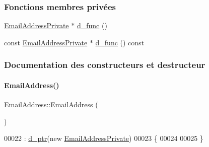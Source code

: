 \subsubsection*{Fonctions membres privées}
\begin{DoxyCompactItemize}
\item 
\hyperlink{class_simple_mail_1_1_email_address_private}{Email\+Address\+Private} $\ast$ \hyperlink{class_simple_mail_1_1_email_address_aa1ad0e3e3ff067e2c41ed350edc23a03}{d\+\_\+func} ()
\item 
const \hyperlink{class_simple_mail_1_1_email_address_private}{Email\+Address\+Private} $\ast$ \hyperlink{class_simple_mail_1_1_email_address_a70c5d2b0aabacfdfa692710f43cf0b5e}{d\+\_\+func} () const
\end{DoxyCompactItemize}


\subsubsection{Documentation des constructeurs et destructeur}
\mbox{\label{class_simple_mail_1_1_email_address_a6d295effd1195009a2c744c67ff270e9}} 
\paragraph{\texorpdfstring{Email\+Address()}{EmailAddress()}\hspace{0.1cm}{\footnotesize\ttfamily [1/3]}}
{\footnotesize\ttfamily Email\+Address\+::\+Email\+Address (\begin{DoxyParamCaption}{ }\end{DoxyParamCaption})}


\begin{DoxyCode}
00022                            : \hyperlink{class_simple_mail_1_1_email_address_a27188c75c77a942e79cac0420788f214}{d\_ptr}(\textcolor{keyword}{new} \hyperlink{class_simple_mail_1_1_email_address_private}{EmailAddressPrivate})
00023 \{
00024 
00025 \}
\end{DoxyCode}
\mbox{\label{class_simple_mail_1_1_email_address_a937f1030d9894fbf8dad50ca57833b7c}} 
